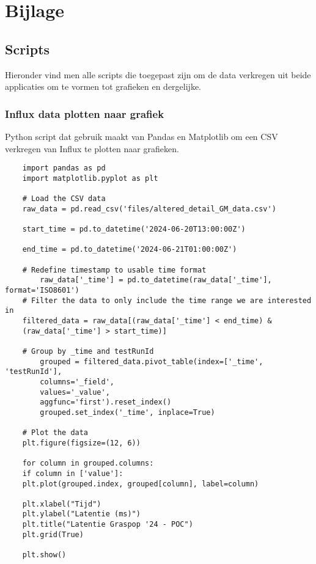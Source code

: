 \chapter{Bijlage}

\section{Scripts}

Hieronder vind men alle scripts die toegepast zijn om de data verkregen uit beide applicaties om te vormen tot grafieken en dergelijke.

\subsection{Influx data plotten naar grafiek}

Python script dat gebruik maakt van Pandas en Matplotlib om een CSV verkregen van Influx te plotten naar grafieken. 

\begin{verbatim}
    import pandas as pd
    import matplotlib.pyplot as plt
    
    # Load the CSV data
    raw_data = pd.read_csv('files/altered_detail_GM_data.csv')
    
    start_time = pd.to_datetime('2024-06-20T13:00:00Z')
    
    end_time = pd.to_datetime('2024-06-21T01:00:00Z')
    
    # Redefine timestamp to usable time format
        raw_data['_time'] = pd.to_datetime(raw_data['_time'], format='ISO8601')
    # Filter the data to only include the time range we are interested in
    filtered_data = raw_data[(raw_data['_time'] < end_time) & 
    (raw_data['_time'] > start_time)]
    
    # Group by _time and testRunId
        grouped = filtered_data.pivot_table(index=['_time', 'testRunId'],
        columns='_field',
        values='_value',
        aggfunc='first').reset_index()
        grouped.set_index('_time', inplace=True)
    
    # Plot the data
    plt.figure(figsize=(12, 6))
    
    for column in grouped.columns:
    if column in ['value']:
    plt.plot(grouped.index, grouped[column], label=column)
    
    plt.xlabel("Tijd")
    plt.ylabel("Latentie (ms)")
    plt.title("Latentie Graspop '24 - POC")
    plt.grid(True)
    
    plt.show()
\end{verbatim}

